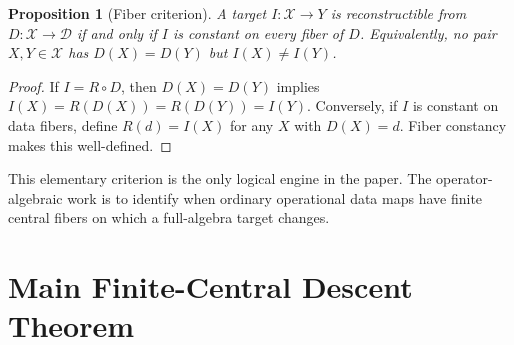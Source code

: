 \documentclass[12pt]{article}
\newtheorem{proposition}{Proposition}
\theoremstyle{definition}
\theoremstyle{remark}
\newcommand{\D}{\mathcal D}
\begin{document}
\begin{proposition}[Fiber criterion]
\label{prop:fiber}
A target \(I:\mathcal X\to Y\) is reconstructible from \(D:\mathcal X\to\D\)
if and only if \(I\) is constant on every fiber of \(D\).  Equivalently, no
pair \(X,Y\in\mathcal X\) has \(D(X)=D(Y)\) but \(I(X)\ne I(Y)\).
\end{proposition}

\begin{proof}
If \(I=R\circ D\), then \(D(X)=D(Y)\) implies \(I(X)=R(D(X))=R(D(Y))=I(Y)\).
Conversely, if \(I\) is constant on data fibers, define
\(R(d)=I(X)\) for any \(X\) with \(D(X)=d\).  Fiber constancy makes this
well-defined.
\end{proof}

This elementary criterion is the only logical engine in the paper.  The
operator-algebraic work is to identify when ordinary operational data maps have
finite central fibers on which a full-algebra target changes.

\section{Main Finite-Central Descent Theorem}
\end{document}
